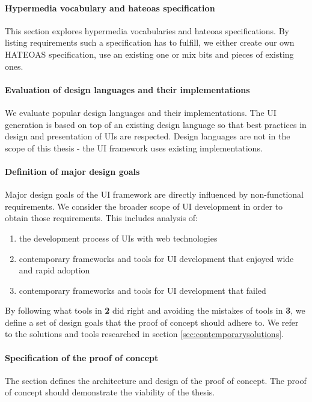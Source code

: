 \paragraph{Hypermedia vocabulary and \gls{hateoas} specification}
This section explores hypermedia vocabularies and \gls{hateoas} specifications. By listing requirements such a specification has to fulfill, we either create our own HATEOAS specification, use an existing one or mix bits and pieces of existing ones.

\paragraph{Evaluation of design languages and their implementations}
We evaluate popular design languages and their implementations. The UI generation is based on top of an existing design language so that best practices in design and presentation of UIs are respected. Design languages are not in the scope of this thesis - the UI framework uses existing implementations.

\paragraph{Definition of major design goals}
Major design goals of the UI framework are directly influenced by non-functional requirements. We consider the broader scope of UI development in order to obtain those requirements. This includes analysis of:

\begin{enumerate}
  \item the development process of UIs with web technologies
  \item contemporary frameworks and tools for UI development that enjoyed wide and rapid adoption
  \item contemporary frameworks and tools for UI development that failed
\end{enumerate}

By following what tools in \textbf{2} did right and avoiding the mistakes of tools in \textbf{3}, we define a set of design goals that the proof of concept should adhere to. We refer to the solutions and tools researched in section \ref{sec:contemporarysolutions}.

\paragraph{Specification of the proof of concept}
The section defines the architecture and design of the proof of concept. The proof of concept should demonstrate the viability of the thesis.

